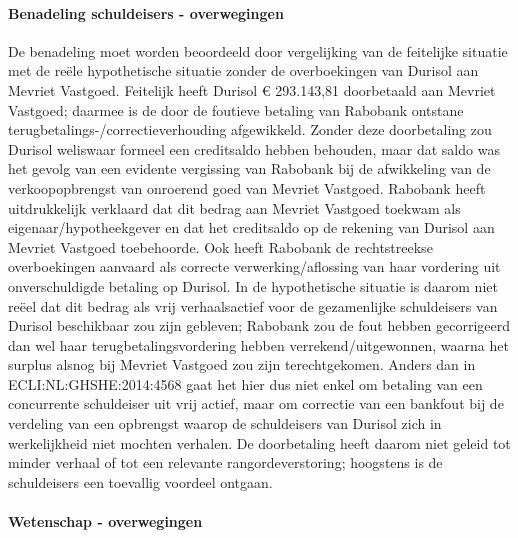 \documentclass[
  dutch,
  a4paper,
]{article}
\begin{document}
\paragraph{Benadeling schuldeisers - overwegingen}\label{benadeling-schuldeisers---overwegingen-16}

De benadeling moet worden beoordeeld door vergelijking van de feitelijke situatie met de reële hypothetische situatie zonder de overboekingen van Durisol aan Mevriet Vastgoed. Feitelijk heeft Durisol € 293.143,81 doorbetaald aan Mevriet Vastgoed; daarmee is de door de foutieve betaling van Rabobank ontstane terugbetalings-/correctieverhouding afgewikkeld. Zonder deze doorbetaling zou Durisol weliswaar formeel een creditsaldo hebben behouden, maar dat saldo was het gevolg van een evidente vergissing van Rabobank bij de afwikkeling van de verkoopopbrengst van onroerend goed van Mevriet Vastgoed. Rabobank heeft uitdrukkelijk verklaard dat dit bedrag aan Mevriet Vastgoed toekwam als eigenaar/hypotheekgever en dat het creditsaldo op de rekening van Durisol aan Mevriet Vastgoed toebehoorde. Ook heeft Rabobank de rechtstreekse overboekingen aanvaard als correcte verwerking/aflossing van haar vordering uit onverschuldigde betaling op Durisol. In de hypothetische situatie is daarom niet reëel dat dit bedrag als vrij verhaalsactief voor de gezamenlijke schuldeisers van Durisol beschikbaar zou zijn gebleven; Rabobank zou de fout hebben gecorrigeerd dan wel haar terugbetalingsvordering hebben verrekend/uitgewonnen, waarna het surplus alsnog bij Mevriet Vastgoed zou zijn terechtgekomen. Anders dan in ECLI:NL:GHSHE:2014:4568 gaat het hier dus niet enkel om betaling van een concurrente schuldeiser uit vrij actief, maar om correctie van een bankfout bij de verdeling van een opbrengst waarop de schuldeisers van Durisol zich in werkelijkheid niet mochten verhalen. De doorbetaling heeft daarom niet geleid tot minder verhaal of tot een relevante rangordeverstoring; hoogstens is de schuldeisers een toevallig voordeel ontgaan.

\paragraph{Wetenschap - overwegingen}\label{wetenschap---overwegingen-16}
\end{document}
